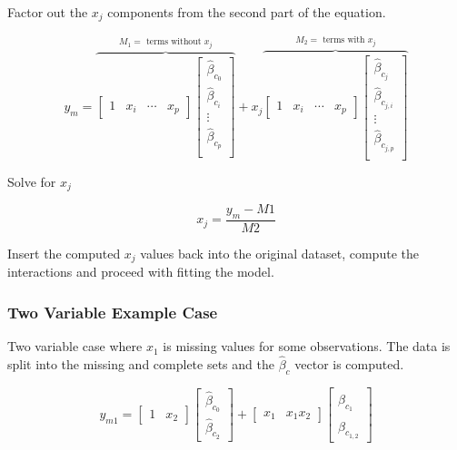 \documentclass[../../paper.tex]{subfiles}
\begin{document}
Factor out the $x_{j}$ components from the second part of the equation.

\begin{equation}
  y_{m} =
  \overbrace{
  \begin{bmatrix}
    1 & x_{i} & \cdots & x_{p}
  \end{bmatrix}
  \begin{bmatrix}
    \hat{\beta}_{c_0} \\
    \hat{\beta}_{c_i} \\
    \vdots \\
    \hat{\beta}_{c_p} \\
  \end{bmatrix}}^{M_{1} = \text{ terms without } x_{j}} +
  x_{j}
  \overbrace{
  \begin{bmatrix}
    1 & x_{i} & \cdots & x_{p}
  \end{bmatrix}
  \begin{bmatrix}
    \hat{\beta}_{c_{j}} \\
    \hat{\beta}_{c_{j,i}} \\
    \vdots \\
    \hat{\beta}_{c_{j,p}} \\
  \end{bmatrix}}^{M_{2} = \text{ terms with } x_{j}}
\end{equation}

Solve for $x_{j}$

\begin{equation}
x_{j} = \frac{y_{m} - M1}{M2}
\end{equation}

Insert the computed $x_{j}$ values back into the original dataset, compute the interactions and proceed with fitting the model.

\subsubsection{Two Variable Example Case}
Two variable case where $x_{1}$ is missing values for some observations. The data
is split into the missing and complete sets and the $\hat{\beta}_{c}$ vector is
computed.

\begin{equation}
  y_{m1} =
  \begin{bmatrix}
    1 & x_{2}
  \end{bmatrix}
  \begin{bmatrix}
    \hat{\beta}_{c_0} \\
    \hat{\beta}_{c_2}
  \end{bmatrix} +
  \begin{bmatrix}
    x_{1} & x_{1}x_{2}
  \end{bmatrix}
  \begin{bmatrix}
    \hat{\beta}_{c_1} \\
    \hat{\beta}_{c_{1,2}}
  \end{bmatrix}
\end{equation}
\end{document}

